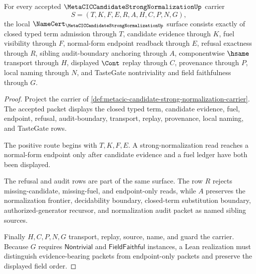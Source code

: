 \begin{theorem}
\label{thm:metacic-candidate-strong-normalization-namecert-obligations}
For every accepted $\MetaCICCandidateStrongNormalizationUp$ carrier
$$
S=(T,K,F,E,R,A,H,C,P,N,G),
$$
the local $\NameCert_{\MetaCICCandidateStrongNormalizationUp}$ surface consists exactly of closed typed term admission through $T$, candidate evidence through $K$, fuel visibility through $F$, normal-form endpoint readback through $E$, refusal exactness through $R$, sibling audit-boundary anchoring through $A$, componentwise $\hsame$ transport through $H$, displayed $\Cont$ replay through $C$, provenance through $P$, local naming through $N$, and TasteGate nontriviality and field faithfulness through $G$.
\end{theorem}
\begin{proof}
Project the carrier of \autoref{def:metacic-candidate-strong-normalization-carrier}. The accepted packet displays the closed typed term, candidate evidence, fuel, endpoint, refusal, audit-boundary, transport, replay, provenance, local naming, and TasteGate rows.

The positive route begins with $T,K,F,E$. A strong-normalization read reaches a normal-form endpoint only after candidate evidence and a fuel ledger have both been displayed.

The refusal and audit rows are part of the same surface. The row $R$ rejects missing-candidate, missing-fuel, and endpoint-only reads, while $A$ preserves the normalization frontier, decidability boundary, closed-term substitution boundary, authorized-generator recursor, and normalization audit packet as named sibling sources.

Finally $H,C,P,N,G$ transport, replay, source, name, and guard the carrier. Because $G$ requires $\mathsf{Nontrivial}$ and $\mathsf{FieldFaithful}$ instances, a Lean realization must distinguish evidence-bearing packets from endpoint-only packets and preserve the displayed field order.
\end{proof}

